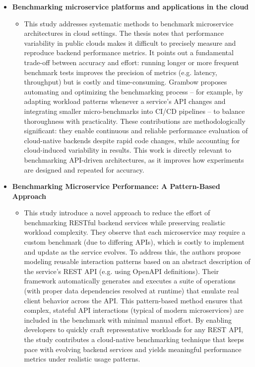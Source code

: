 \documentclass[11pt]{article}
\begin{document}
\begin{itemize}
\begin{itemize}
    \end{itemize}
    \item[] \textbf{Benchmarking microservice platforms and applications in the cloud}
    \begin{itemize}
        \item[] This study addresses systematic methods to benchmark microservice architectures in cloud settings. The thesis notes that performance variability in public clouds makes it difficult to precisely measure and reproduce backend performance metrics. It points out a fundamental trade-off between accuracy and effort: running longer or more frequent benchmark tests improves the precision of metrics (e.g. latency, throughput) but is costly and time-consuming. Grambow proposes automating and optimizing the benchmarking process – for example, by adapting workload patterns whenever a service’s API changes and integrating smaller micro-benchmarks into CI/CD pipelines – to balance thoroughness with practicality. These contributions are methodologically significant: they enable continuous and reliable performance evaluation of cloud-native backends despite rapid code changes, while accounting for cloud-induced variability in results. This work is directly relevant to benchmarking API-driven architectures, as it improves how experiments are designed and repeated for accuracy.
    \end{itemize}
    \newpage
    \item[] \textbf{Benchmarking Microservice Performance: A Pattern-Based Approach}
    \begin{itemize}
        \item[] This study introduce a novel approach to reduce the effort of benchmarking RESTful backend services while preserving realistic workload complexity. They observe that each microservice may require a custom benchmark (due to differing APIs), which is costly to implement and update as the service evolves. To address this, the authors propose modeling reusable interaction patterns based on an abstract description of the service’s REST API (e.g. using OpenAPI definitions). Their framework automatically generates and executes a suite of operations (with proper data dependencies resolved at runtime) that emulate real client behavior across the API. This pattern-based method ensures that complex, stateful API interactions (typical of modern microservices) are included in the benchmark with minimal manual effort. By enabling developers to quickly craft representative workloads for any REST API, the study contributes a cloud-native benchmarking technique that keeps pace with evolving backend services and yields meaningful performance metrics under realistic usage patterns.

\end{itemize}
\end{itemize}
\end{document}
